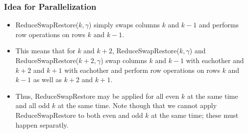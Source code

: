 \documentclass{beamer}
\begin{document}
\begin{frame}
\frametitle{Idea for Parallelization}
\begin{itemize}
\item ReduceSwapRestore($k,\gamma$) simply swaps columns $k$ and $k-1$ and performs row operations on rows $k$ and $k-1$.
\item This means that for $k$ and $k+2$, ReduceSwapRestore($k,\gamma$) and ReduceSwapRestore($k+2,\gamma$) swap columns $k$ and $k-1$ with eachother and $k+2$ and $k+1$ with eachother and perform row operations on rows $k$ and $k-1$ as well as $k+2$ and $k+1$.
\item Thus, ReduceSwapRestore may be applied for all even $k$ at the same time and all odd $k$ at the same time. Note though that we cannot apply ReduceSwapRestore to both even and odd $k$ at the same time; these must happen separatly.
\end{itemize}
\end{frame}
\end{document}
